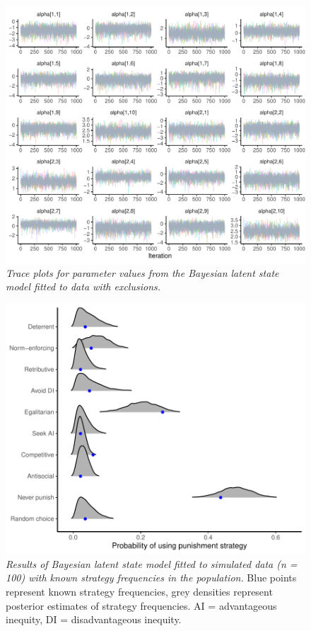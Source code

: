 \documentclass[
  man,floatsintext]{apa6}
\begin{document}
\newpage




\begin{figure}
\centering
\includegraphics{manuscript_files/figure-latex/plotTrace-1.pdf}
\caption{\label{fig:plotTrace}\emph{Trace plots for parameter values from the Bayesian
latent state model fitted to data with exclusions.}}
\end{figure}

\newpage







\begin{figure}
\centering
\includegraphics{manuscript_files/figure-latex/plotSim-1.pdf}
\caption{\label{fig:plotSim}\emph{Results of Bayesian latent state model fitted to simulated
data (n = 100) with known strategy frequencies in the population.} Blue points
represent known strategy frequencies, grey densities represent posterior
estimates of strategy frequencies. AI = advantageous inequity, DI =
disadvantageous inequity.}
\end{figure}
\end{document}
